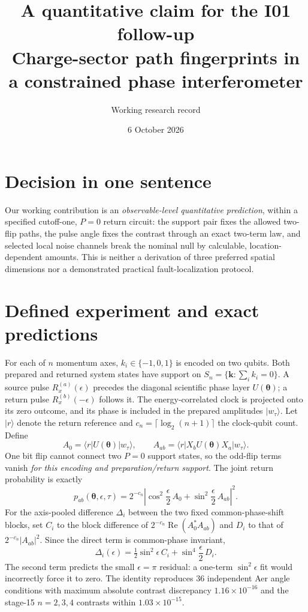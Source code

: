 \documentclass[11pt,a4paper]{article}
\title{A quantitative claim for the I01 follow-up\\
\large Charge-sector path fingerprints in a constrained phase interferometer}
\author{Working research record}
\date{6 October 2026}
\begin{document}
\maketitle
\vspace{-1.5em}

\section*{Decision in one sentence}
Our working contribution is an \emph{observable-level quantitative prediction}, within a specified cutoff-one, $P=0$ return circuit: the support pair fixes the allowed two-flip paths, the pulse angle fixes the contrast through an exact two-term law, and selected local noise channels break the nominal null by calculable, location-dependent amounts. This is neither a derivation of three preferred spatial dimensions nor a demonstrated practical fault-localization protocol.

\section*{Defined experiment and exact predictions}
For each of $n$ momentum axes, $k_i\in\{-1,0,1\}$ is encoded on two qubits. Both prepared and returned system states have support on $S_n=\{\boldsymbol k:\sum_i k_i=0\}$. A source pulse $R_x^{(a)}(\epsilon)$ precedes the diagonal scientific phase layer $U(\boldsymbol\theta)$; a return pulse $R_x^{(b)}(-\epsilon)$ follows it. The energy-correlated clock is projected onto its zero outcome, and its phase is included in the prepared amplitudes $|w_\tau\rangle$. Let $|r\rangle$ denote the return reference and $c_n=\lceil\log_2(n+1)\rceil$ the clock-qubit count. Define
\begin{equation}
 A_0=\langle r|U(\boldsymbol\theta)|w_\tau\rangle,
 \qquad A_{ab}=\langle r|X_b U(\boldsymbol\theta)X_a|w_\tau\rangle.
\end{equation}
One bit flip cannot connect two $P=0$ support states, so the odd-flip terms vanish \emph{for this encoding and preparation/return support}. The joint return probability is exactly
\begin{equation}\label{eq:amp}
 p_{ab}(\boldsymbol\theta,\epsilon,\tau)
 =2^{-c_n}\left|\cos^2\!\frac{\epsilon}{2}\,A_0
       +\sin^2\!\frac{\epsilon}{2}\,A_{ab}\right|^2.
\end{equation}
For the axis-pooled difference $\Delta_i$ between the two fixed common-phase-shift blocks, set $C_i$ to the block difference of $2^{-c_n}\operatorname{Re}(A_0^*A_{ab})$ and $D_i$ to that of $2^{-c_n}|A_{ab}|^2$. Since the direct term is common-phase invariant,
\begin{equation}\label{eq:angle}
 \Delta_i(\epsilon)=\tfrac12\sin^2\!\epsilon\,C_i
                      +\sin^4\!\frac{\epsilon}{2}\,D_i.
\end{equation}
The second term predicts the small $\epsilon=\pi$ residual: a one-term $\sin^2\epsilon$ fit would incorrectly force it to zero. The identity reproduces 36 independent Aer angle conditions with maximum absolute contrast discrepancy $1.16\times10^{-16}$ and the stage-15 $n=2,3,4$ contrasts within $1.03\times10^{-15}$.
\end{document}
